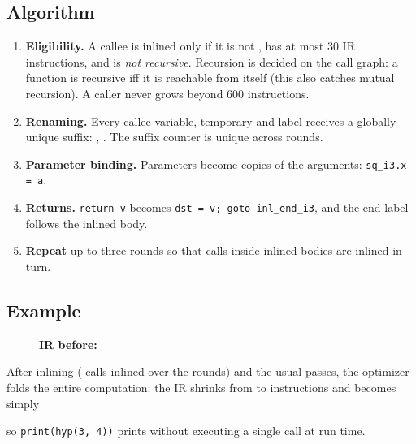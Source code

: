 \subsection{Algorithm}
\begin{enumerate}
  \item \textbf{Eligibility.} A callee is inlined only if it is not , has at most 30 IR instructions, and is \emph{not recursive}. Recursion is decided on the call graph: a function is recursive iff it is reachable from itself (this also catches mutual recursion). A caller never grows beyond 600 instructions.
  \item \textbf{Renaming.} Every callee variable, temporary and label receives a globally unique suffix: , . The suffix counter is unique across rounds.
  \item \textbf{Parameter binding.} Parameters become copies of the arguments: \verb|sq_i3.x = a|.
  \item \textbf{Returns.} \verb|return v| becomes \verb|dst = v; goto inl_end_i3|, and the end label follows the inlined body.
  \item \textbf{Repeat} up to three rounds so that calls inside inlined bodies are inlined in turn.
\end{enumerate}

\subsection{Example}
\begin{figure}[H]
\begin{minipage}[t]{0.40\textwidth}\end{minipage}\hfill
\begin{minipage}[t]{0.55\textwidth}\textbf{IR before:}\\[-6pt]\begingroup\lstset{style=tiny}\endgroup\end{minipage}
\end{figure}
After inlining (\InlCount{} calls inlined over the rounds) and the usual passes, the optimizer folds the entire computation: the IR shrinks from \InlBefore{} to \InlAfter{} instructions and  becomes simply

\begingroup\lstset{style=tiny}\endgroup

so \verb|print(hyp(3, 4))| prints \InlOut{} without executing a single call at run time.

